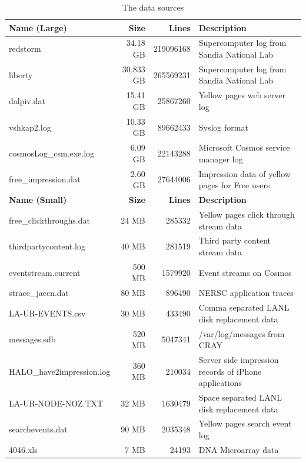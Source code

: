\begin{table}[t]
\centering
\begin{tabular}{|l|r|r|l|} \hline
{\bf Name (Large)} & {\bf Size} & {\bf Lines} & {\bf Description} \\ \hline
redstorm & 34.18 GB & 219096168 & Supercomputer log from Sandia National Lab	\\ \hline
liberty & 30.833 GB & 265569231 &	Supercomputer log from Sandia National Lab\\ \hline
dalpiv.dat & 15.41 GB & 25867260 &	Yellow pages web server log \\ \hline
vshkap2.log & 10.33 GB & 89662433	& Syslog format \\ \hline
cosmosLog\_csm.exe.log & 6.09 GB & 22143288 & Microsoft Cosmos service manager log\\ \hline
free\_impression.dat & 2.60 GB & 27644006 & Impression data of yellow pages for Free users\\ \hline \hline
{\bf Name (Small)} & {\bf Size} & {\bf Lines} & {\bf Description} \\ \hline
free\_clickthroughs.dat & 24 MB & 285332 & Yellow pages click through stream data \\ \hline
thirdpartycontent.log & 40 MB & 281519 &	Third party content stream data \\ \hline
eventstream.current & 500 MB & 1579920 &	Event streams on Cosmos \\ \hline
strace\_jaccn.dat & 80 MB & 896490 & NERSC application traces \\ \hline
LA-UR-EVENTS.csv & 30 MB &  433490 & Comma separated LANL disk replacement data\\ \hline
messages.sdb & 520 MB & 5047341 &	/var/log/messages from CRAY\\ \hline
HALO\_have2impression.log & 360 MB &  210034 & Server side impression records of iPhone applications\\ \hline
LA-UR-NODE-NOZ.TXT & 32 MB &  1630479 & Space separated LANL disk replacement data\\ \hline
searchevents.dat & 90 MB & 2035348 & Yellow pages search event log \\ \hline
4046.xls & 7 MB & 24193 & DNA Microarray data\\ \hline
\end{tabular}
\caption{The data sources}\label{tab:sources}
\end{table}

